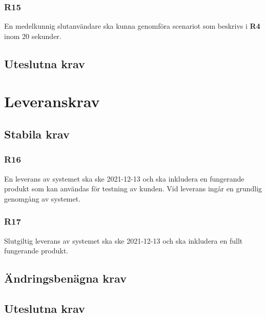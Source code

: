 \documentclass{article}
\begin{document}
    \subsubsection*{R15}
    En medelkunnig slutanvändare ska kunna genomföra scenariot som beskrivs i \textbf{R4} inom 20 sekunder.
    
    \subsection*{Uteslutna krav}
    
    \section{Leveranskrav}
    
    \subsection*{Stabila krav}
     \subsubsection*{R16}
     En leverans av systemet ska ske 2021-12-13 och ska inkludera en fungerande produkt som kan användas för testning av kunden. Vid leverans ingår en grundlig genomgång av systemet.
     
     \subsubsection*{R17}
     Slutgiltig leverans av systemet ska ske 2021-12-13 och ska inkludera en fullt fungerande produkt.
     
     
    \subsection*{Ändringsbenägna krav}
    
    \subsection*{Uteslutna krav}
    
    
   

\end{document}
